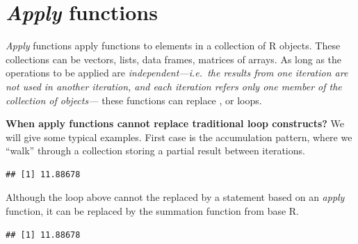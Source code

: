 \documentclass[krantz2]{krantz}\usepackage{knitr}%
\begin{document}
\section[Apply functions]{\emph{Apply} functions}\label{sec:data:apply}

\emph{Apply} functions apply functions to elements in a collection of R objects. These collections can be vectors, lists, data frames, matrices of arrays. As long as the operations to be applied are \emph{independent---i.e.\ the results from one iteration are not used in another iteration, and each iteration refers only one member of the collection of objects---} these functions can replace ,  or  loops.

\begin{explainbox}
\textbf{When apply functions cannot replace traditional loop constructs?} We will give some typical examples. First case is the accumulation pattern, where we ``walk'' through a collection storing a partial result between iterations.

\begin{knitrout}\footnotesize
{}\color{fgcolor}\begin{kframe}
\begin{alltt}
\hlstd{(}\hlstd{)}
 \hlkwb{<-} \hlstd{(}\hlstd{)}
 \hlkwb{<-} 
   \hlstd{(} 
   \hlkwb{<-}  \hlopt{+} 
  \hlstd{\}}
\end{alltt}
\begin{verbatim}
## [1] 11.88678
\end{verbatim}
\end{kframe}
\end{knitrout}

Although the loop above cannot the replaced by a statement based on an \emph{apply} function, it can be replaced by the summation function  from base R.
\begin{knitrout}\footnotesize
{}\color{fgcolor}\begin{kframe}
\begin{alltt}
\hlstd{(}\hlstd{)}
 \hlkwb{<-} \hlstd{(}\hlstd{)}
 \hlkwb{<-} 
\end{alltt}
\begin{verbatim}
## [1] 11.88678
\end{verbatim}
\end{kframe}
\end{knitrout}


\end{explainbox}
\end{document}
